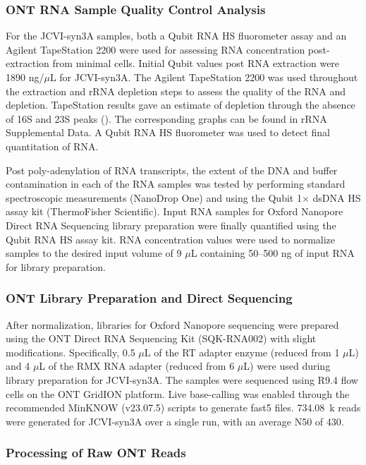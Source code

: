 \subsubsection{ONT RNA Sample Quality Control Analysis}

For the JCVI-syn3A samples, both a Qubit RNA HS fluorometer assay and an Agilent TapeStation 2200 were used for assessing RNA concentration post-extraction from minimal cells.
Initial Qubit values post RNA extraction were 1890 ng/$\mu$L for JCVI-syn3A.
The Agilent TapeStation 2200 was used throughout the extraction and rRNA depletion steps to assess the quality of the RNA and depletion.
TapeStation results gave an estimate of depletion through the absence of 16S and 23S peaks (\sdqc).
The corresponding graphs can be found in rRNA Supplemental Data.
A Qubit RNA HS fluorometer was used to detect final quantitation of RNA.

Post poly-adenylation of RNA transcripts, the extent of the DNA and buffer contamination in each of the RNA samples was tested by performing standard spectroscopic measurements (NanoDrop One) and using the Qubit 1$\times$ dsDNA HS assay kit (ThermoFisher Scientific).
Input RNA samples for Oxford Nanopore Direct RNA Sequencing library preparation were finally quantified using the Qubit RNA HS assay kit.
RNA concentration values were used to normalize samples to the desired input volume of 9 $\mu$L containing 50--500 ng of input RNA for library preparation.

\subsubsection{ONT Library Preparation and Direct Sequencing}

After normalization, libraries for Oxford Nanopore sequencing were prepared using the ONT Direct RNA Sequencing Kit (SQK-RNA002) with slight modifications.
Specifically, 0.5 $\mu$L of the RT adapter enzyme (reduced from 1 $\mu$L) and 4 $\mu$L of the RMX RNA adapter (reduced from 6 $\mu$L) were used during library preparation for JCVI-syn3A.
The samples were sequenced using R9.4 flow cells on the ONT GridION platform.
Live base-calling was enabled through the recommended MinKNOW (v23.07.5) scripts to generate fast5 files.
734.08~k reads were generated for JCVI-syn3A over a single run, with an average N50 of 430.

\subsubsection{Processing of Raw ONT Reads}

